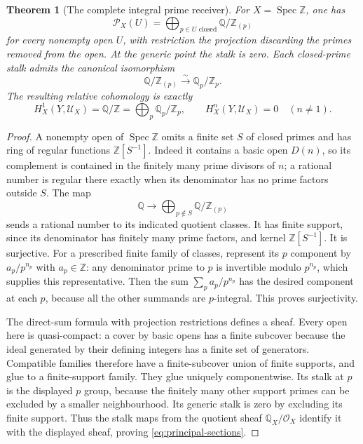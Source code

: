 \documentclass[11pt,a4paper]{article}
\newtheorem{theorem}{Theorem}[section]
\theoremstyle{definition}\newtheorem{definition}[theorem]{Definition}
\newcommand{\Spec}{\operatorname{Spec}}\newcommand{\SpecMon}{\operatorname{Spec}_{\mathrm{mon}}}
\providecommand{\PP}{\mathcal P}
\begin{document}
\begin{theorem}[The complete integral prime receiver]
\label{thm:integer-receiver}
For $X=\Spec\mathbb Z$, one has
\[
 \PP_X(U)=\bigoplus_{p\in U\text{ closed}}\mathbb Q/\mathbb Z_{(p)}
 \tag{RP23}\label{eq:principal-sections}
\]
for every nonempty open $U$, with restriction the projection discarding
the primes removed from the open. At the generic point the stalk is
zero. Each closed-prime stalk admits the canonical isomorphism
\[
 \mathbb Q/\mathbb Z_{(p)}\xrightarrow{\sim}\mathbb Q_p/\mathbb Z_p.
 \tag{RP24}\label{eq:completion-quotient}
\]
The resulting relative cohomology is exactly
\[
 H_X^1(Y,\mathcal U_X)=\mathbb Q/\mathbb Z
  =\bigoplus_p\mathbb Q_p/\mathbb Z_p,
 \qquad H_X^n(Y,\mathcal U_X)=0\quad(n\ne1).
 \tag{RP25}\label{eq:integer-relative}
\]
\end{theorem}
\begin{proof}
A nonempty open of $\Spec\mathbb Z$ omits a finite set $S$ of closed
primes and has ring of regular functions $\mathbb Z[S^{-1}]$.
Indeed it contains a basic open $D(n)$, so its complement is contained
in the finitely many prime divisors of $n$; a rational number is regular
there exactly when its denominator has no prime factors outside $S$.
The map
\[
 \mathbb Q\longrightarrow\bigoplus_{p\notin S}
                    \mathbb Q/\mathbb Z_{(p)}
 \tag{RP26}\label{eq:rational-principal-map}
\]
sends a rational number to its indicated quotient classes. It has
finite support, since its denominator has finitely many prime factors,
and kernel $\mathbb Z[S^{-1}]$. It is surjective. For a prescribed
finite family of classes, represent its $p$ component by $a_p/p^{n_p}$
with $a_p\in\mathbb Z$: any denominator prime to $p$ is invertible
modulo $p^{n_p}$, which supplies this representative. Then the sum
$\sum_p a_p/p^{n_p}$ has the desired component at each $p$, because
all the other summands are $p$-integral. This proves surjectivity.

The direct-sum formula with projection restrictions defines a sheaf.
Every open here is quasi-compact: a cover by basic opens has a finite
subcover because the ideal generated by their defining integers has
a finite set of generators. Compatible families therefore have a
finite-subcover union of finite supports, and glue to a finite-support
family. They glue uniquely componentwise. Its stalk at $p$ is the
displayed $p$ group, because the finitely many other support primes
can be excluded by a smaller neighbourhood. Its generic stalk is zero
by excluding its finite support. Thus the stalk maps from the quotient
sheaf $\mathbb Q_X/\mathcal O_X$ identify it with the displayed sheaf,
proving \eqref{eq:principal-sections}.


\end{proof}
\end{document}
